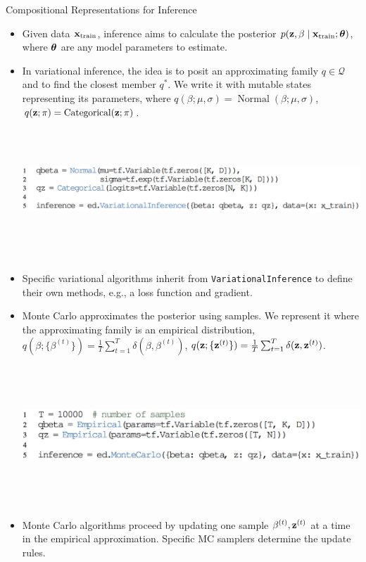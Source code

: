 \documentclass[final]{beamer}
\begin{document}
\begin{frame}[t]
\begin{columns}[t]
\begin{column}{\onecolwid}
\begin{block}{Compositional Representations for Inference}
\begin{itemize}
\item
Given data $\boldsymbol{\mathbf{x}}_{\text{train}}$, inference aims to calculate the
posterior
$p(\mathbf{z}, \beta\mid \mathbf{x}_{\text{train}}; \boldsymbol{\mathbf{\theta}})$, where
$\boldsymbol{\mathbf{\theta}}$ are any model parameters to estimate.
\item
In variational inference, the idea is to posit an approximating family
$q\in\mathcal{Q}$ and to find the closest member $q^*$.
We write it with mutable states representing its parameters,
where
$q(\beta;\mu,\sigma) = \operatorname{Normal}(\beta; \mu,\sigma)$,
$q(\boldsymbol{\mathbf{z}};\pi) = \operatorname{Categorical}(\boldsymbol{\mathbf{z}};\pi)$.
\vspace{2ex}
\hspace{-4.1em}
\includegraphics[height=5.25cm]{img/inference_variational.png}
\item
Specific variational algorithms inherit from
\texttt{VariationalInference} to define their own methods,
e.g., a
loss function and gradient.
\item
Monte Carlo approximates the posterior using samples.
We represent it where
the approximating family is an empirical distribution,
$q(\beta; \{\beta^{(t)}\}) = \frac{1}{T}\sum_{t=1}^T \delta(\beta,
\beta^{(t)})$,
$q(\boldsymbol{\mathbf{z}}; \{\boldsymbol{\mathbf{z}}^{(t)}\}) = \frac{1}{T}\sum_{t=1}^T \delta(\boldsymbol{\mathbf{z}},
\boldsymbol{\mathbf{z}}^{(t)})$.

\vspace{1ex}
\includegraphics[height=5.25cm]{img/inference_monte.png}
\item
Monte Carlo
algorithms proceed by updating one sample $\beta^{(t)},\boldsymbol{\mathbf{z}}^{(t)}$ at a time in the empirical
approximation.
Specific \gls{MC} samplers determine the update rules.
\end{itemize}
\end{block}


\end{column}
\end{columns}
\end{frame}
\end{document}

